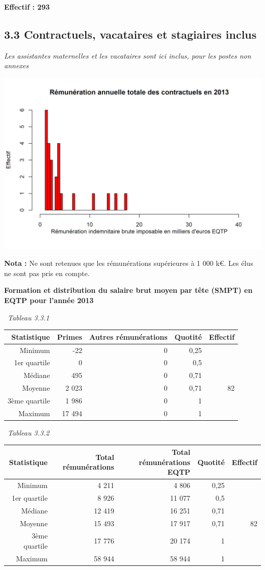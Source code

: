 \textbf{Effectif : 293 }

\hypertarget{contractuels-vacataires-et-stagiaires-inclus-1}{%
\subsection{3.3 Contractuels, vacataires et stagiaires
inclus}\label{contractuels-vacataires-et-stagiaires-inclus-1}}

\emph{Les assistantes maternelles et les vacataires sont ici inclus,
pour les postes non annexes}

\includegraphics{altair_files/figure-latex/unnamed-chunk-94-1.png}

\textbf{Nota :} Ne sont retenues que les rémunérations supérieures à 1
000 k€. Les élus ne sont pas pris en compte.

\textbf{Formation et distribution du salaire brut moyen par tête (SMPT)
en EQTP pour l'année 2013 }

~\emph{Tableau 3.3.1}

\begin{longtable}[]{@{}rrrrr@{}}
\toprule
Statistique & Primes & Autres rémunérations & Quotité &
Effectif\tabularnewline
\midrule
\endhead
Minimum & -22 & 0 & 0,25 &\tabularnewline
1er quartile & 0 & 0 & 0,5 &\tabularnewline
Médiane & 495 & 0 & 0,71 &\tabularnewline
Moyenne & 2 023 & 0 & 0,71 & 82\tabularnewline
3ème quartile & 1 986 & 0 & 1 &\tabularnewline
Maximum & 17 494 & 0 & 1 &\tabularnewline
\bottomrule
\end{longtable}

~\emph{Tableau 3.3.2}

\begin{longtable}[]{@{}rrrrr@{}}
\toprule
Statistique & Total rémunérations & Total rémunérations EQTP & Quotité &
Effectif\tabularnewline
\midrule
\endhead
Minimum & 4 211 & 4 806 & 0,25 &\tabularnewline
1er quartile & 8 926 & 11 077 & 0,5 &\tabularnewline
Médiane & 12 419 & 16 251 & 0,71 &\tabularnewline
Moyenne & 15 493 & 17 917 & 0,71 & 82\tabularnewline
3ème quartile & 17 776 & 20 174 & 1 &\tabularnewline
Maximum & 58 944 & 58 944 & 1 &\tabularnewline
\bottomrule
\end{longtable}

